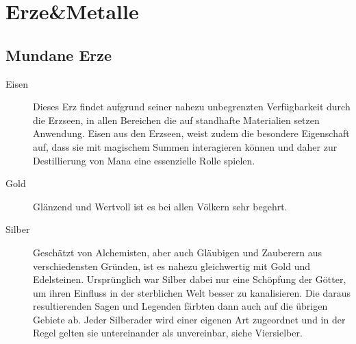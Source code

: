 \documentclass[a4paper,12pt,oneside]{book}
\begin{document}
\chapter{Erze\&Metalle}
\section{Mundane Erze}
\begin{description}
\item[Eisen]Dieses Erz findet aufgrund seiner nahezu unbegrenzten Verfügbarkeit durch die Erzseen, in allen Bereichen die auf standhafte Materialien setzen Anwendung. Eisen aus den Erzseen, weist zudem die besondere Eigenschaft auf, dass sie mit magischem Summen interagieren können und daher zur Destillierung von Mana eine essenzielle Rolle spielen.
\item[Gold]Glänzend und Wertvoll ist es bei allen Völkern sehr begehrt. 
\item[Silber]Geschätzt von Alchemisten, aber auch Gläubigen und Zauberern aus verschiedensten Gründen, ist es nahezu gleichwertig mit Gold und Edelsteinen. Ursprünglich war Silber dabei nur eine Schöpfung der Götter, um ihren Einfluss in der sterblichen Welt besser zu kanalisieren. Die daraus resultierenden Sagen und Legenden färbten dann auch auf die übrigen Gebiete ab. Jeder Silberader wird einer eigenen Art zugeordnet und in der Regel gelten sie untereinander als unvereinbar, siehe Viersielber.    
\end{description}
\end{document}
